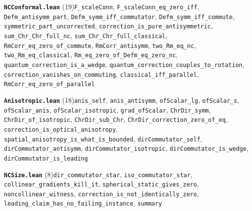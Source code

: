 \documentclass[11pt,a4paper]{article}
\theoremstyle{sudef}
\begin{document}
\noindent\textbf{\texttt{NCConformal.lean}} (19)\quad \texttt{F\_\allowbreak scaleConn}, \texttt{F\_\allowbreak scaleConn\_\allowbreak eq\_\allowbreak zero\_\allowbreak iff}, \texttt{Defm\_\allowbreak antisymm\_\allowbreak part}, \texttt{Defm\_\allowbreak symm\_\allowbreak iff\_\allowbreak commutator}, \texttt{Defm\_\allowbreak symm\_\allowbreak iff\_\allowbreak commute}, \texttt{symmetric\_\allowbreak part\_\allowbreak uncorrected}, \texttt{correction\_\allowbreak is\_\allowbreak pure\_\allowbreak antisymmetric}, \texttt{sum\_\allowbreak Chr\_\allowbreak Chr\_\allowbreak full\_\allowbreak nc}, \texttt{sum\_\allowbreak Chr\_\allowbreak Chr\_\allowbreak full\_\allowbreak classical}, \texttt{RmCorr\_\allowbreak eq\_\allowbreak zero\_\allowbreak of\_\allowbreak commute}, \texttt{RmCorr\_\allowbreak antisymm}, \texttt{two\_\allowbreak Rm\_\allowbreak eq\_\allowbreak nc}, \texttt{two\_\allowbreak Rm\_\allowbreak eq\_\allowbreak classical}, \texttt{Rm\_\allowbreak eq\_\allowbreak zero\_\allowbreak of\_\allowbreak Defm\_\allowbreak eq\_\allowbreak zero\_\allowbreak nc}, \texttt{quantum\_\allowbreak correction\_\allowbreak is\_\allowbreak a\_\allowbreak wedge}, \texttt{quantum\_\allowbreak correction\_\allowbreak couples\_\allowbreak to\_\allowbreak rotation}, \texttt{correction\_\allowbreak vanishes\_\allowbreak on\_\allowbreak commuting}, \texttt{classical\_\allowbreak iff\_\allowbreak parallel}, \texttt{RmCorr\_\allowbreak eq\_\allowbreak zero\_\allowbreak of\_\allowbreak parallel}\par\smallskip
\noindent\textbf{\texttt{Anisotropic.lean}} (18)\quad \texttt{anis\_\allowbreak self}, \texttt{anis\_\allowbreak antisymm}, \texttt{ofScalar\_\allowbreak lg}, \texttt{ofScalar\_\allowbreak s}, \texttt{ofScalar\_\allowbreak anis}, \texttt{ofScalar\_\allowbreak isotropic}, \texttt{grad\_\allowbreak ofScalar}, \texttt{ChrDir\_\allowbreak symm}, \texttt{ChrDir\_\allowbreak of\_\allowbreak isotropic}, \texttt{ChrDir\_\allowbreak sub\_\allowbreak Chr}, \texttt{ChrDir\_\allowbreak correction\_\allowbreak zero\_\allowbreak of\_\allowbreak eq}, \texttt{correction\_\allowbreak is\_\allowbreak optical\_\allowbreak anisotropy}, \texttt{spatial\_\allowbreak anisotropy\_\allowbreak is\_\allowbreak what\_\allowbreak is\_\allowbreak bounded}, \texttt{dirCommutator\_\allowbreak self}, \texttt{dirCommutator\_\allowbreak antisymm}, \texttt{dirCommutator\_\allowbreak isotropic}, \texttt{dirCommutator\_\allowbreak is\_\allowbreak wedge}, \texttt{dirCommutator\_\allowbreak is\_\allowbreak leading}\par\smallskip
\noindent\textbf{\texttt{NCSize.lean}} (8)\quad \texttt{dir\_\allowbreak commutator\_\allowbreak star}, \texttt{iso\_\allowbreak commutator\_\allowbreak star}, \texttt{collinear\_\allowbreak gradients\_\allowbreak kill\_\allowbreak it}, \texttt{spherical\_\allowbreak static\_\allowbreak gives\_\allowbreak zero}, \texttt{noncollinear\_\allowbreak witness}, \texttt{correction\_\allowbreak is\_\allowbreak not\_\allowbreak identically\_\allowbreak zero}, \texttt{leading\_\allowbreak claim\_\allowbreak has\_\allowbreak no\_\allowbreak failing\_\allowbreak instance}, \texttt{summary}\par\smallskip
\end{document}
